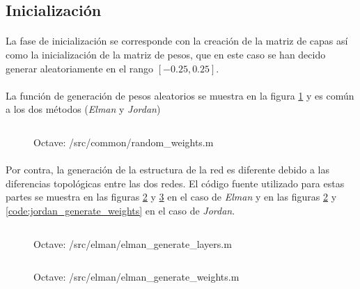 \documentclass[10pt, a4paper,spanish]{article}
\begin{document}
		\subsection{Inicialización}

			\paragraph{}
			La fase de inicialización se corresponde con la creación de la matriz de capas así como la inicialización de la matriz de pesos, que en este caso se han decido generar aleatoriamente en el rango $[-0.25,0.25]$.

			\paragraph{}
			La función de generación de pesos aleatorios se muestra en la figura \ref{code:random_weights} y es común a los dos métodos (\emph{Elman} y \emph{Jordan})

			\begin{figure}[htpb!]
				\centering
				\inputminted{octave}{../src/common/random_weights.m}
				\caption{Octave: /src/common/random\_weights.m}
				\label{code:random_weights}
			\end{figure}

			\paragraph{}
			Por contra, la generación de la estructura de la red es diferente debido a las diferencias topológicas entre las dos redes. El código fuente utilizado para estas partes se muestra en las figuras \ref{code:jordan_generate_layers} y \ref{code:elman_generate_weights} en el caso de \emph{Elman} y en las figuras \ref{code:jordan_generate_layers} y \ref{code:jordan_generate_weights} en el caso de \emph{Jordan}.

			\begin{figure}[htpb!]
				\centering
				\inputminted{octave}{../src/elman/elman_generate_layers.m}
				\caption{Octave: /src/elman/elman\_generate\_layers.m}
				\label{code:jordan_generate_layers}
			\end{figure}

			\begin{figure}[htpb!]
				\centering
				\inputminted{octave}{../src/elman/elman_generate_weights.m}
				\caption{Octave: /src/elman/elman\_generate\_weights.m}
				\label{code:elman_generate_weights}
			\end{figure}
\end{document}
